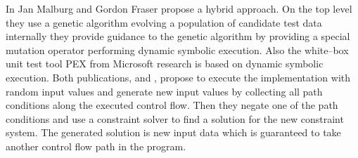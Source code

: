 \documentclass[runningheads,a4paper]{llncs}%
\begin{document}
In \cite{malburg2011combining} Jan Malburg and Gordon Fraser propose a hybrid approach. On the top level they use a genetic algorithm evolving a population of candidate test data internally they provide guidance to the genetic algorithm by providing a special mutation operator performing dynamic symbolic execution. Also the white--box unit test tool PEX \cite{pex} from Microsoft\textsuperscript{\textregistered} research is based on dynamic symbolic execution. Both publications, \cite{malburg2011combining} and \cite{pex}, propose to execute the implementation with random input values and generate new input values by collecting all path conditions along the executed control flow. Then they negate one of the path conditions and use a constraint solver to find a solution for the new constraint system. The generated solution is new input data which is guaranteed to take another control flow path in the program.\\%
\end{document}
